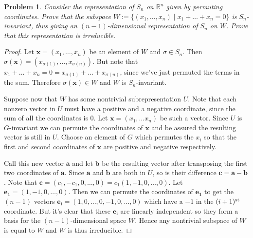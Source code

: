 \documentclass{article}
\newtheorem{problem}{Problem}
\begin{document}
\begin{problem}
Consider the representation of $S_n$ on $\mathbb{R}^n$ given by permuting coordinates. Prove that the subspace $W := \{(x_1, \dots , x_n) \mid x_1 + \dots + x_n = 0\}$ is $S_n$-invariant, thus giving an $(n-1)$-dimensional representation of $S_n$ on $W$. Prove that this representation is irreducible.
\end{problem}
\begin{proof}
Let $\mathbf{x} = (x_1, \dots , x_n)$ be an element of $W$ and $\sigma \in S_n$. Then $\sigma(\mathbf{x}) = (x_{\sigma(1)}, \dots , x_{\sigma(n)})$. But note that $x_1 + \dots + x_n = 0 = x_{\sigma(1)} + \dots + x_{\sigma(n)}$, since we've just permuted the terms in the sum. Therefore $\sigma(\mathbf{x}) \in W$ and $W$ is $S_n$-invariant.

Suppose now that $W$ has some nontrivial subrepresentation $U$. Note that each nonzero vector in $U$ must have a positive and a negative coordinate, since the sum of all the coordinates is $0$. Let $\mathbf{x} = (x_1, \dots x_n)$ be such a vector. Since $U$ is $G$-invariant we can permute the coordinates of $\mathbf{x}$ and be assured the resulting vector is still in $U$. Choose an element of $G$ which permutes the $x_i$ so that the first and second coordinates of $\mathbf{x}$ are positive and negative respectively.

Call this new vector $\mathbf{a}$ and let $\mathbf{b}$ be the resulting vector after transposing the first two coordinates of $\mathbf{a}$. Since $\mathbf{a}$ and $\mathbf{b}$ are both in $U$, so is their difference $\mathbf{c} = \mathbf{a} - \mathbf{b}$. Note that $\mathbf{c} = (c_1, -c_1, 0, \dots , 0) = c_1(1, -1, 0 , \dots , 0)$. Let $\mathbf{e_1} = (1, -1, 0, \dots , 0)$. Then we can permute the coordinates of $\mathbf{e_1}$ to get the $(n-1)$ vectors $\mathbf{e_i} = (1, 0, \dots , 0, -1, 0, \dots , 0)$ which have a $-1$ in the $(i+1)^{\textup{st}}$ coordinate. But it's clear that these $\mathbf{e_i}$ are linearly independent so they form a basis for the $(n-1)$-dimensional space $W$. Hence any nontrivial subspace of $W$ is equal to $W$ and $W$ is thus irreducible.
\end{proof}
\end{document}
